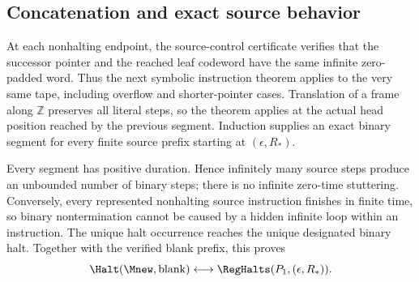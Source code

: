 \subsection{Concatenation and exact source behavior}

At each nonhalting endpoint, the source-control certificate verifies
that the successor pointer and the reached leaf codeword have the same
infinite zero-padded word. Thus the next symbolic instruction theorem
applies to the very same tape, including overflow and shorter-pointer
cases. Translation of a frame along $\mathbb Z$ preserves all literal
steps, so the theorem applies at the actual head position reached by the
previous segment. Induction supplies an exact binary segment for every
finite source prefix starting at $(\epsilon,R_*)$.

Every segment has positive duration. Hence infinitely many source steps
produce an unbounded number of binary steps; there is no infinite
zero-time stuttering. Conversely, every represented nonhalting source
instruction finishes in finite time, so binary nontermination cannot be
caused by a hidden infinite loop within an instruction. The unique halt
occurrence reaches the unique designated binary halt. Together with the
verified blank prefix, this proves
\[
 \Halt(\Mnew,\mathrm{blank})
            \longleftrightarrow \RegHalts(P_1,(\epsilon,R_*)).
\]
